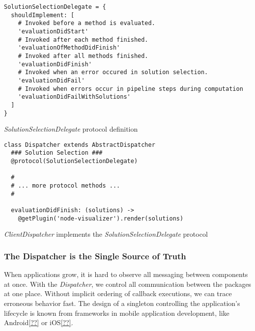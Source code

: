 \documentclass[../ClassicThesis.tex]{subfiles}
\begin{document}
\begin{listing}[!h]
\centering
\begin{verbatim}
SolutionSelectionDelegate = {
  shouldImplement: [
    # Invoked before a method is evaluated.
    'evaluationDidStart'
    # Invoked after each method finished.
    'evaluationOfMethodDidFinish'
    # Invoked after all methods finished.
    'evaluationDidFinish'
    # Invoked when an error occured in solution selection.
    'evaluationDidFail'
    # Invoked when errors occur in pipeline steps during computation
    'evaluationDidFailWithSolutions'
  ]
}
\end{verbatim}
\caption{\emph{SolutionSelectionDelegate} protocol definition}
\label{lst:solutionselectiondelegate}
\end{listing}

\begin{listing}[!h]
\begin{verbatim}
class Dispatcher extends AbstractDispatcher
  ### Solution Selection ###
  @protocol(SolutionSelectionDelegate)

  #
  # ... more protocol methods ...
  #

  evaluationDidFinish: (solutions) ->
    @getPlugin('node-visualizer').render(solutions)
\end{verbatim}
\caption{\emph{ClientDispatcher} implements the \emph{SolutionSelectionDelegate}
  protocol}
\label{lst:client_dispatcher_protocol}
\end{listing}



\subsubsection{The Dispatcher is the Single Source of Truth}
\label{sec:disp-single-source}

When applications grow, it is hard to observe all messaging between components
at once. With the \emph{Dispatcher}, we control all communication between the
packages at one place. Without implicit ordering of callback executions, we can
trace erroneous behavior fast. The design of a singleton controlling the
application's lifecycle is known from frameworks in mobile application
development, like Android\ref{??} or iOS\ref{??}.
\end{document}
